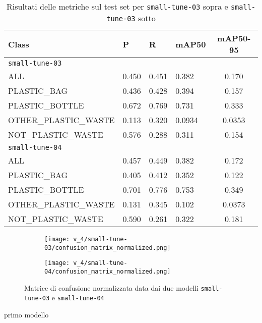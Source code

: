     \begin{table}[!htbp]
        \centering
        \begin{tabularx}{\textwidth}{lYYYc}
            \toprule
            Class & P & R & mAP50 & mAP50-95 \\
            \midrule
            \texttt{small-tune-03} \\
            \midrule
            ALL & 0.450 & 0.451 & 0.382 & 0.170 \\
            PLASTIC\_BAG & 0.436 & 0.428 & 0.394 & 0.157 \\
            PLASTIC\_BOTTLE & 0.672 & 0.769 & 0.731 & 0.333 \\
            OTHER\_PLASTIC\_WASTE & 0.113 & 0.320 & 0.0934 & 0.0353 \\
            NOT\_PLASTIC\_WASTE & 0.576 & 0.288 & 0.311 & 0.154 \\
            \midrule
            \texttt{small-tune-04} \\
            \midrule
            ALL & 0.457 & 0.449 & 0.382 & 0.172 \\
            PLASTIC\_BAG & 0.405 & 0.412 & 0.352 & 0.122 \\
            PLASTIC\_BOTTLE & 0.701 & 0.776 & 0.753 & 0.349 \\
            OTHER\_PLASTIC\_WASTE & 0.131 & 0.345 & 0.102 & 0.0373 \\
            NOT\_PLASTIC\_WASTE & 0.590 & 0.261 & 0.322 & 0.181 \\
            \bottomrule
        \end{tabularx}
        \caption{Risultati delle metriche sul test set per \texttt{small-tune-03} sopra e \texttt{small-tune-03} sotto}
        \label{table:v4-1}
    \end{table}

    \begin{figure}[!htb]
        \centering
        \begin{subfigure}{.49\textwidth}
            \texttt{[image: v\_4/small-tune-03/confusion\_matrix\_normalized.png]}
            \label{fig:v4-4.1}
        \end{subfigure}
        \begin{subfigure}{.49\textwidth}
            \texttt{[image: v\_4/small-tune-04/confusion\_matrix\_normalized.png]}
            \label{fig:v4-4.1}
        \end{subfigure}
        \caption{Matrice di confusione normalizzata data dai due modelli \texttt{small-tune-03} e \texttt{small-tune-04}}
        \label{fig:v4-4}
    \end{figure}


primo modello